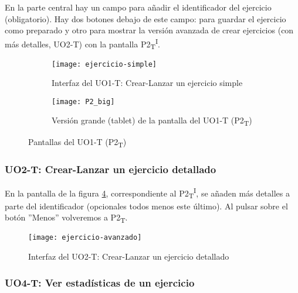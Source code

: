 En la parte central hay un campo para añadir el identificador del ejercicio (obligatorio). Hay dos botones debajo de este campo: para guardar el ejercicio como preparado y otro para mostrar la versión avanzada de crear ejercicios (con más detalles, UO2-T) con la pantalla P2\textsubscript{T}\textsuperscript{I}.\\

\noindent
\begin{figure}[!htbp]
\begin{subfigure}[t]{0.3\textwidth}
	\centering
	\texttt{[image: ejercicio-simple]}
	\caption{Interfaz del UO1-T: Crear-Lanzar un ejercicio simple}
	\label{fig:crear-lanzar-ejercicio-simple}
\end{subfigure}
%
\begin{subfigure}[t]{0.7\textwidth}
	\centering
	\texttt{[image: P2\_big]}
	\caption{Versión grande (tablet) de la pantalla del UO1-T (P2\textsubscript{T})}
	\label{fig:crear-lanzar-ejercicio-simple-big}
\end{subfigure}

\caption{Pantallas del UO1-T (P2\textsubscript{T})}
\label{diseno-e-implementacion:interfaces:profesor}
\end{figure}

\subsubsection{UO2-T: Crear-Lanzar un ejercicio detallado}
\label{diseno-e-implementacion:interfaces:profesor:uo2-t}

En la pantalla de la figura \ref{fig:crear-lanzar-ejercicio-avanzados}, correspondiente al P2\textsubscript{T}\textsuperscript{I}, se añaden más detalles a parte del identificador (opcionales todos menos este último). Al pulsar sobre el botón ''Menos'' volveremos a P2\textsubscript{T}.\\

\noindent
\begin{figure}[!htbp]
	\centering
	\texttt{[image: ejercicio-avanzado]}
	\caption{Interfaz del UO2-T: Crear-Lanzar un ejercicio detallado}
	\label{fig:crear-lanzar-ejercicio-avanzados}
\end{figure}

\subsubsection{UO4-T: Ver estadísticas de un ejercicio}
\label{diseno-e-implementacion:interfaces:profesor:uo4-t}

